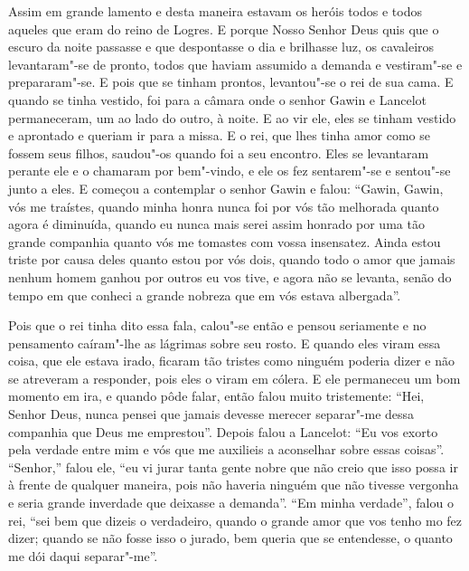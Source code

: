 Assim em grande lamento e desta maneira estavam os heróis todos e todos aqueles
que eram do reino de Logres. E porque Nosso Senhor Deus quis que o escuro da
noite passasse e que despontasse o dia e brilhasse luz, os cavaleiros
levantaram"-se de pronto, todos que haviam assumido a demanda e vestiram"-se e
prepararam"-se. E pois que se tinham prontos, levantou"-se o rei de sua cama. E
quando se tinha vestido, foi para a câmara onde o senhor Gawin e Lancelot
permaneceram, um ao lado do outro, à noite. E ao vir ele, eles se tinham
vestido e aprontado e queriam ir para a missa. E o rei, que lhes tinha amor
como se fossem seus filhos, saudou"-os quando foi a seu encontro. Eles se
levantaram perante ele e o chamaram por bem"-vindo, e ele os fez sentarem"-se e
sentou"-se junto a eles. E começou a contemplar o senhor Gawin e falou: “Gawin,
Gawin, vós me traístes, quando minha honra nunca foi por vós tão melhorada
quanto agora é diminuída, quando eu nunca mais serei assim honrado por uma tão
grande companhia quanto vós me tomastes com vossa insensatez. Ainda estou
triste por causa deles quanto estou por vós dois, quando todo o amor que jamais
nenhum homem ganhou por outros eu vos tive, e agora não se levanta, senão do
tempo em que conheci a grande nobreza que em vós estava albergada”. 

Pois que o rei tinha dito essa fala, calou"-se então e pensou seriamente e no
pensamento caíram"-lhe as lágrimas sobre seu rosto. E quando eles viram essa
coisa, que ele estava irado, ficaram tão tristes como ninguém poderia dizer e
não se atreveram a responder, pois eles o viram em cólera. E ele permaneceu um
bom momento em ira, e quando pôde falar, então falou muito tristemente: “Hei,
Senhor Deus, nunca pensei que jamais devesse merecer separar"-me dessa companhia
que Deus me emprestou”. Depois falou a Lancelot: “Eu vos exorto pela verdade
entre mim e vós que me auxilieis a aconselhar sobre essas coisas”. “Senhor,”
falou ele, “eu vi jurar tanta gente nobre que não creio que isso possa ir à
frente de qualquer maneira, pois não haveria ninguém que não tivesse vergonha e
seria grande inverdade que deixasse a demanda”. “Em minha verdade”,
falou o rei, “sei bem que dizeis o verdadeiro, quando o grande amor que vos
tenho mo fez dizer; quando se não fosse isso o jurado, bem queria que se
entendesse, o quanto me dói daqui separar"-me”.

